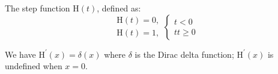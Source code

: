 The step function $\mathrm{H}(t)$, defined as:
\[ 
\begin{array}{c} 
  \mathrm{H}(t) = 0, \\
  \mathrm{H}(t) = 1, 
\end{array}
\left \{ 
\begin{array}{c} 
  t < 0 \\
  tt \geq 0 
\end{array}
\right . \]
\par
We have
 $ \mathrm{H}^{\prime} (x)= \delta(x) $  where  $\delta$  is the Dirac delta function;
$\mathrm{H}^{\prime}(x)$ is undefined when $x=0$.